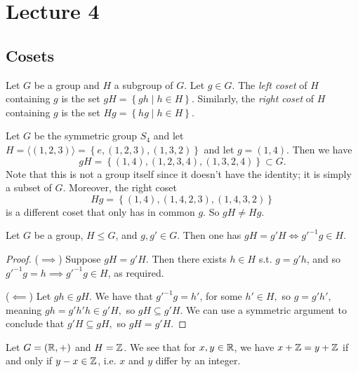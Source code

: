 \section{Lecture 4}
\subsection{Cosets}
\begin{definition}
  Let $G$ be a group and $H$ a subgroup of $G$. Let $g\in G$. The \emph{left coset} of $H$
  containing $g$ is the set $gH=\left\{ gh \mid h\in H \right\}$. Similarly, the \emph{right coset} of $H$
  containing $g$ is the set $Hg=\left\{ hg \mid h\in H \right\}$.
  \label{coset}
\end{definition}

\begin{example}
  Let $G$ be the symmetric group $S_4$ and let $H=\langle(1,2,3)\rangle=\left\{
e,(1,2,3), (1,3,2) \right\}$ and let $g=(1,4)$. Then we have 
\[gH = \left\{ (1,4), (1,2,3,4), (1,3,2,4) \right\} \subset G.\]
Note that this is not a group itself since it doesn't have the identity; it is simply a
subset of $G$. Moreover, the right coset
\[Hg = \left\{ (1,4), (1,4,2,3), (1,4,3,2) \right\}\]
is a different coset that only has in common $g$. So $gH\neq Hg$.
\end{example}

\begin{theorem}
  Let $G$ be a group, $H\leq G$, and $g,g'\in G$. Then one has $gH=g'H \iff g'^{-1}g\in H$.
\end{theorem}
\begin{proof}
  ($\implies$) Suppose $gH=g'H$. Then there
  exists $h\in H$ s.t. $g=g'h$, and so $g'^{-1}g=h \implies g'^{-1}g\in H$, as required.

  ($\impliedby$) Let $gh\in gH$. We have that $g'^{-1}g = h'$, for some $h'\in H,$ so $g = g'h',$ meaning $gh = g'h'h \in g'H,$ so $gH \subseteq g'H$. We can use a symmetric argument to conclude that $g'H \subseteq gH,$ so $gH = g'H$.
\end{proof}

\begin{example}
  Let $G=(\mathbb R,+)$ and $H=\mathbb Z$. We see that for $x,y \in \mathbb R$, we have $x+\mathbb Z=y+\mathbb Z$ if and only if
  $y-x\in \mathbb Z$, i.e.  $x$ and $y$ differ by an integer.
\end{example}


